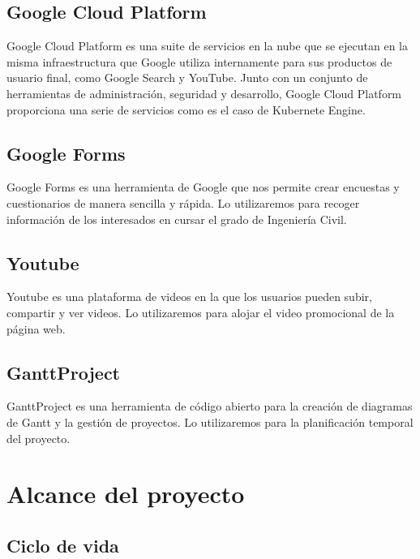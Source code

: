 \documentclass{report}
\begin{document}
        \section*{Google Cloud Platform}
            Google Cloud Platform es una suite de servicios en la nube que se ejecutan en la misma infraestructura que Google utiliza internamente para sus productos de usuario final, como Google Search y YouTube. Junto con un conjunto de herramientas de administración, seguridad y desarrollo, Google Cloud Platform proporciona una serie de servicios como es el caso de Kubernete Engine.
        \section*{Google Forms}
            Google Forms es una herramienta de Google que nos permite crear encuestas y cuestionarios de manera sencilla y rápida. Lo utilizaremos para recoger información de los interesados en cursar el grado de Ingeniería Civil.
        \section*{Youtube}
            Youtube es una plataforma de videos en la que los usuarios pueden subir, compartir y ver videos. Lo utilizaremos para alojar el video promocional de la página web.
        \section*{GanttProject}
            GanttProject es una herramienta de código abierto para la creación de diagramas de Gantt y la gestión de proyectos. Lo utilizaremos para la planificación temporal del proyecto.
    \chapter{Alcance del proyecto} %
        \section{Ciclo de vida}
\end{document}
